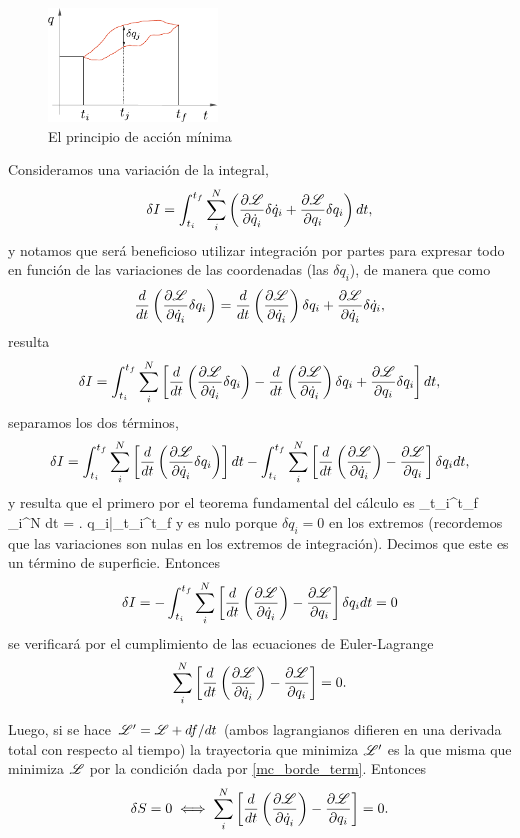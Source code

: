 \documentclass[10pt,oneside]{CBFT_article}
\begin{document}
\begin{figure}
	\begin{center}
	\includegraphics[width=0.4\textwidth]{images/fig_accion.pdf}	 
	\end{center}
	\caption{El principio de acción mínima}
\end{figure}

Consideramos una variación de la integral,
\[
\delta I =  \int_{t_i}^{t_f} \sum_i^N \left( \dpar{\Lag}{\dot{q}_i} \delta \dot{q}_i + \dpar{\Lag}{q_i} \delta q_i  \right) dt,
\]
y notamos que será beneficioso utilizar integración por partes para expresar todo en función de
las variaciones de las coordenadas (las $\delta q_i$), de manera que como
\[
\frac{d}{dt}\left( \dpar{\Lag}{\dot{q}_i} \delta q_i \right) =
\frac{d}{dt}\left( \dpar{\Lag}{\dot{q}_i} \right) \delta q_i + \dpar{\Lag}{\dot{q}_i}\delta \dot{q}_i,
\]
resulta
\[
\delta I =  \int_{t_i}^{t_f} \sum_i^N \left[ \frac{d}{dt}\left( \dpar{\Lag}{\dot{q}_i} \delta q_i \right) -
\frac{d}{dt}\left( \dpar{\Lag}{\dot{q}_i} \right) \delta q_i + \dpar{\Lag}{q_i} \delta q_i  \right] dt,
\]
separamos los dos términos,
\[
\delta I =  \int_{t_i}^{t_f} \sum_i^N \left[ \frac{d}{dt}\left( \dpar{\Lag}{\dot{q}_i} \delta q_i \right) \right] dt -
\int_{t_i}^{t_f} \sum_i^N \left[ \frac{d}{dt}\left( \dpar{\Lag}{\dot{q}_i} \right) - \dpar{\Lag}{q_i} 
\right]  \delta q_i  dt,
\]
y resulta que el primero por el teorema fundamental del cálculo es
\be
\int_{t_i}^{t_f} \sum_i^N  dt =
\left.  \delta q_i\right|_{t_i}^{t_f}
\label{mc_borde_term}
\ee
y es nulo porque $\delta q_i=0$ en los extremos (recordemos que las variaciones son nulas en los extremos de
integración). Decimos que este es un término de superficie.
Entonces
\[
\delta I =  -\int_{t_i}^{t_f} \sum_i^N \left[ \frac{d}{dt}\left( \dpar{\Lag}{\dot{q}_i} \right) - \dpar{\Lag}{q_i} 
\right]  \delta q_i  dt = 0
\]
se verificará por el cumplimiento de las ecuaciones de Euler-Lagrange
\[
\sum_i^N  \left[ \frac{d}{dt}\left( \dpar{\Lag}{\dot{q}_i} \right) - \dpar{\Lag}{q_i} \right] = 0.
\]

Luego, si se hace $\Lag' = \Lag + df/dt$ (ambos lagrangianos difieren en una derivada total con 
respecto al tiempo) la trayectoria que minimiza $\Lag'$ es la que misma que minimiza
$\Lag$ por la condición dada por \eqref{mc_borde_term}. Entonces 
\[
\delta S = 0 \iff \sum_i^N  \left[ \frac{d}{dt}\left( \dpar{\Lag}{\dot{q}_i} \right) - \dpar{\Lag}{q_i} \right] = 0.
\]
\end{document}
